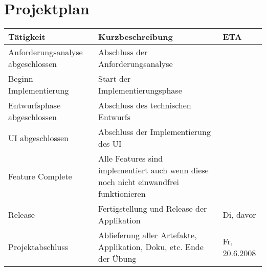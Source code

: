 

\section{Projektplan}

\begin{tabular}{ | p{4cm} | p{8cm} |  p{3cm} |}
\hline
\textbf{Tätigkeit} & \textbf{Kurzbeschreibung} & \textbf{ETA} \\
\hline
Anforderungsanalyse abgeschlossen &	Abschluss der Anforderungsanalyse & \\
\hline
Beginn Implementierung &	Start der Implementierungsphase	 & \\
\hline
Entwurfsphase abgeschlossen	& Abschluss des technischen Entwurfs	 & \\
\hline
UI abgeschlossen &	Abschluss der Implementierung des UI &	\\
\hline
Feature Complete &	Alle Features sind implementiert auch wenn diese noch nicht einwandfrei funktionieren & \\
\hline
Release &	Fertigstellung und Release der Applikation	& Di, davor \\
\hline
Projektabschluss &	Ablieferung aller Artefakte, Applikation, Doku, etc. Ende der Übung	& Fr, 20.6.2008 \\
\hline
\end{tabular}